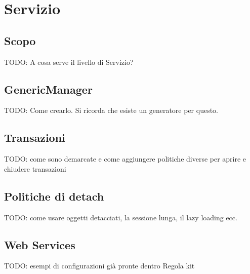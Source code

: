 \chapter{Servizio}

\section{Scopo}
TODO: A cosa serve il livello di Servizio?

\section{GenericManager}
TODO: Come crearlo. Si ricorda che esiste un generatore per questo.

\section{Transazioni}
TODO: come sono demarcate e come aggiungere politiche diverse per aprire e chiudere transazioni

\section{Politiche di detach}
TODO: come usare oggetti detacciati, la sessione lunga, il lazy loading ecc.

\section{Web Services}
TODO: esempi di configurazioni già pronte dentro Regola kit